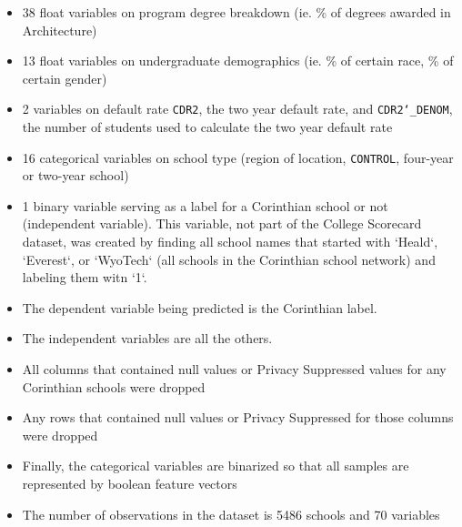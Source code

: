 \documentclass[10pt,twocolumn]{article}
\begin{document}
\begin{itemize}

\item 38 float variables on program degree breakdown (ie. \% of degrees awarded in Architecture)
\item 13 float variables on undergraduate demographics (ie. \% of certain race, \% of certain gender)
\item 2 variables on default rate \texttt{CDR2}, the two year default rate, and \texttt{CDR2\char`_DENOM},
the number of students used to calculate the two year default rate
\item 16 categorical variables on school type (region of location, \texttt{CONTROL}, four-year or two-year school)
\item 1 binary variable serving as a label for a Corinthian school or not (independent variable).
This variable, not part of the College Scorecard dataset, was created by finding all school
names that started with `Heald`, `Everest`, or `WyoTech` (all schools in the Corinthian school network)
and labeling them witn `1`.
\item The dependent variable being predicted is the Corinthian label.
\item The independent variables are all the others.
\item All columns that contained null values or Privacy Suppressed values for
any Corinthian schools were dropped
\item Any rows that contained null values or Privacy Suppressed for those columns were dropped
\item Finally, the categorical variables are binarized so that all samples
are represented by boolean feature vectors
\item The number of observations in the dataset is 5486 schools and 70 variables
\end{itemize}
\end{document}
